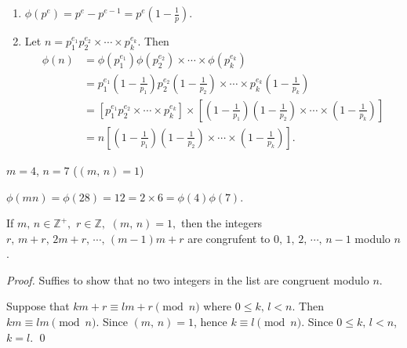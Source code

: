 \begin{remark}
    \begin{enumerate}
        \item $\phi\left(p^e\right) = p^e-p^{e-1} = p^e\left(1-\frac{1}{p}\right)$.
        \item Let $n=p_1^{e_1}p_2^{e_2}\times\cdots\times p_k^{e_k}$. Then
        \begin{align*}
            \phi\left(n\right)&=  \phi\left(p_1^{e_1}\right) \phi\left(p_2^{e_2}\right)\times\cdots\times \phi\left(p_k^{e_k}\right) \\
            &= p_1^{e_1} \left(1-\frac{1}{p_1}\right) p_2^{e_2} \left(1-\frac{1}{p_2}\right) \times\cdots\times p_k^{e_k} \left(1-\frac{1}{p_k}\right) \\
            &= \left[p_1^{e_1} p_2^{e_2} \times\cdots\times p_k^{e_k}\right] \times \left[\left(1-\frac{1}{p_1}\right) \left(1-\frac{1}{p_2}\right) \times\cdots\times \left(1-\frac{1}{p_k}\right)\right] \\
            &= n \left[\left(1-\frac{1}{p_1}\right) \left(1-\frac{1}{p_2}\right) \times\cdots\times \left(1-\frac{1}{p_k}\right)\right].
        \end{align*}
    \end{enumerate}
\end{remark}

\begin{note}
    $m=4$, $n=7$ ($\left(m,\,n\right)=1$)

    $\phi\left(mn\right)=\phi\left(28\right) = 12 = 2 \times 6 =\phi\left(4\right)\phi\left(7\right)$.
\end{note}

\begin{lemma}
    If $m,\,n \in \mathbb{Z}^+,$ $r \in \mathbb{Z},$ $\left(m,\,n\right)=1,$ then
    the integers $r,\,m+r,\,2m+r,\,\cdots,\,\left(m-1\right)m+r$
    are congrufent to $0,\,1,\,2,\,\cdots,\,n-1$ modulo $n$.
\end{lemma}
\begin{proof}
    Suffies to show that no two integers in the list are congruent modulo $n$.

    Suppose that $km+r \equiv lm+r\pmod{n}$ where $0 \leq k,\,l < n$. Then
    $km \equiv lm\pmod{n}$.
    Since $\left(m,\,n\right)=1$, hence $k \equiv l\pmod{n}$.
    Since $0 \leq k,\,l < n$, $k=l$. \qed
\end{proof}

